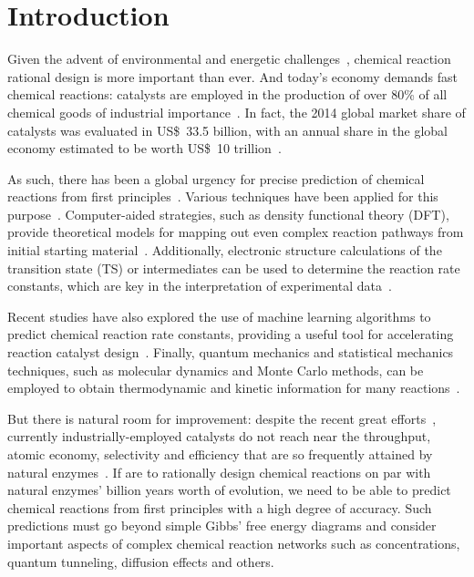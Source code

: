 \chapter{Introduction}%
\label{ch:introduction}

Given the advent of environmental and energetic challenges~\cite{Bertozzi_2016},
chemical reaction rational design is more important than ever.
And today's economy demands fast chemical reactions:
catalysts are employed in the production of over 80\% of all chemical
goods of industrial
importance~\cite{Breakthrough_Catalyst,GlobalCatalystMarket}.
In fact, the 2014 global market share of catalysts was evaluated in US\$~33.5 billion,
with an annual share in the global economy estimated to be worth US\$~10
trillion~\cite{GlobalCatalystMarket}.

As such, there has been a global urgency for precise prediction of chemical reactions from first principles~\cite{Kitchin_2012}.
Various techniques have been applied for this purpose~\cite{Chin_2022,Cao2022}.
Computer-aided strategies, such as density functional theory (DFT),
provide theoretical models for mapping out even complex reaction pathways from initial starting material~\cite{Maeda_2011,Simm_2017,Rappoport_2019}.
Additionally, electronic structure calculations of the transition state (TS) or intermediates can be used to determine the reaction rate constants,
which are key in the interpretation of experimental data~\cite{Plata_2015,Santoro_2016,Coelho_2019,Oliveira_2020}.

Recent studies have also explored the use of machine learning algorithms
to predict chemical reaction rate constants, providing a useful tool for
accelerating reaction catalyst design~\cite{MLPredictKinetics}.
Finally, quantum mechanics and statistical mechanics techniques,
such as molecular dynamics and Monte Carlo methods,
can be employed to obtain thermodynamic and kinetic information for many reactions~\cite{MolecularDynamics,montecarlo}.

But there is natural room for improvement:
despite the recent great efforts~\cite{Peng_2016}, currently industrially-employed catalysts do
not reach near the throughput, atomic economy, selectivity and efficiency that
are so frequently attained by natural
enzymes~\cite{Catalysis_in_Chemistry_and_Enzymology}.
If are to rationally design chemical reactions on par with natural enzymes' billion years worth of evolution,
we need to be able to predict chemical reactions from first principles with a
high degree of accuracy.
Such predictions must go beyond simple Gibbs' free energy
diagrams and consider important aspects of complex chemical reaction networks
such as concentrations, quantum tunneling, diffusion effects and others.

